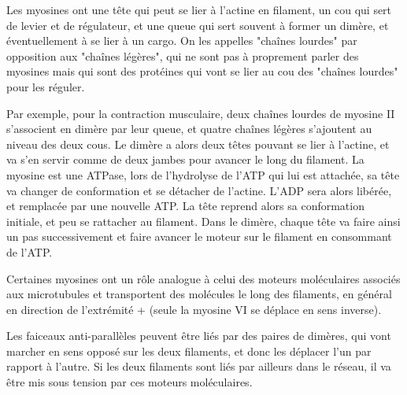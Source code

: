 Les myosines ont une tête qui peut se lier à l'actine en filament, un cou  qui sert de levier et de régulateur, et une queue qui sert souvent à former un dimère, et éventuellement à se lier à un cargo. On les appelles "chaînes lourdes" par opposition aux "chaînes légères", qui ne sont pas à proprement parler des myosines mais qui sont des protéines qui vont se lier au cou des "chaînes lourdes" pour les réguler. 

Par exemple, pour la contraction musculaire, deux chaînes lourdes de myosine II s'associent en dimère par leur queue, et quatre chaînes légères s'ajoutent au niveau des deux cous. Le dimère a alors deux têtes pouvant se lier à l'actine, et va s'en servir comme de deux jambes pour avancer le long du filament. 
La myosine est une ATPase, lors de l'hydrolyse de l'ATP qui lui est attachée, sa tête va changer de conformation et se détacher de l'actine. L'ADP sera alors libérée, et remplacée par une nouvelle ATP.  La tête reprend alors sa conformation initiale, et peu se rattacher au filament. Dans le dimère, chaque tête va faire ainsi un pas successivement et faire avancer le moteur sur le filament en consommant de l'ATP. 



Certaines myosines ont un rôle analogue à celui des moteurs moléculaires associés aux microtubules et transportent des molécules le long des filaments, en général en direction de l'extrémité + (seule la myosine VI se déplace en sens inverse). 


Les faiceaux anti-parallèles peuvent être liés par des paires de dimères, qui vont marcher en sens opposé sur les deux filaments, et donc les déplacer l'un par rapport à l'autre. Si les deux filaments sont liés par ailleurs dans le réseau, il va être mis sous tension par ces moteurs moléculaires.

